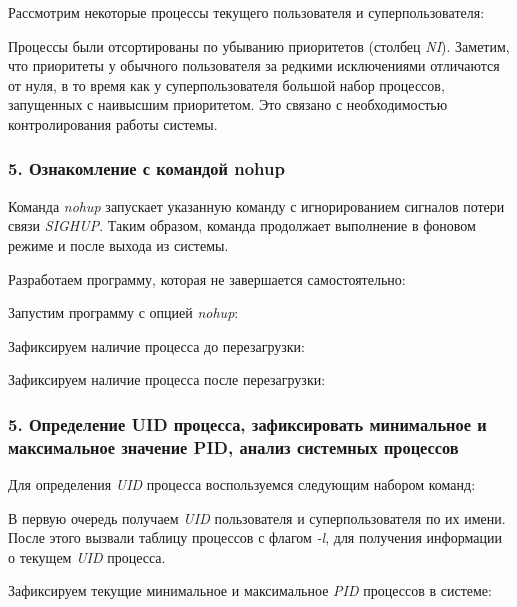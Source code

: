 \documentclass[14pt,a4paper,report]{report}
\begin{document}
Рассмотрим некоторые процессы текущего пользователя и суперпользователя:



Процессы были отсортированы по убыванию приоритетов (столбец \emph{NI}). Заметим, что приоритеты у обычного пользователя за редкими исключениями отличаются от нуля, в то время как у суперпользователя большой набор процессов, запущенных с наивысшим приоритетом. Это связано с необходимостью контролирования работы системы.

\subsubsection{5. Ознакомление с командой nohup}

Команда \emph{nohup} запускает указанную команду с игнорированием сигналов потери связи \emph{SIGHUP}. Таким образом, команда продолжает выполнение в фоновом режиме и после выхода из системы.

Разработаем программу, которая не завершается самостоятельно:



Запустим программу с опцией \emph{nohup}:



Зафиксируем наличие процесса до перезагрузки:



Зафиксируем наличие процесса после перезагрузки:



\subsubsection{5. Определение UID процесса, зафиксировать минимальное и максимальное значение PID, анализ системных процессов}

Для определения \emph{UID} процесса воспользуемся следующим набором команд:



В первую очередь получаем \emph{UID} пользователя и суперпользователя по их имени. После этого вызвали таблицу процессов с флагом \emph{-l}, для получения информации о текущем \emph{UID} процесса.

Зафиксируем текущие минимальное и максимальное \emph{PID} процессов в системе:


\end{document}
